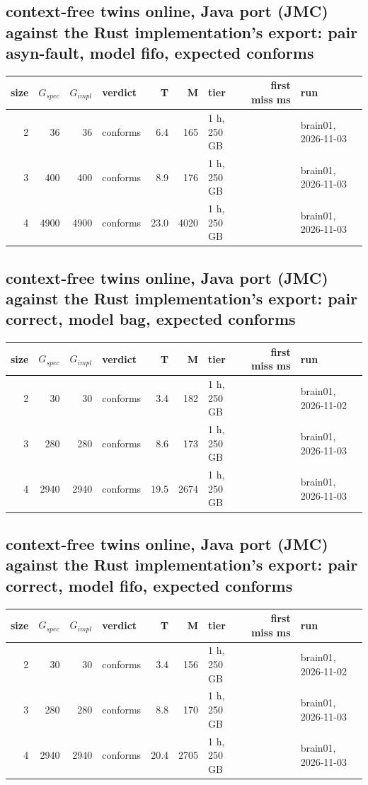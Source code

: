 \documentclass[10pt]{article}
\begin{document}
\subsection*{context-free twins online, Java port (JMC) against the Rust implementation's export: pair \textsf{asyn-fault}, model fifo, expected conforms}
\begin{longtable}{@{}rrrlrrlrl@{}}
\toprule
size & $G_{\mathit{spec}}$ & $G_{\mathit{impl}}$ & verdict & T & M & tier & first miss ms & run \\
\midrule
\endhead
\color{blue} 2 & 36 & 36 & conforms & 6.4 & 165 & 1 h, 250 GB &  & brain01, 2026-11-03 \\
\color{blue} 3 & 400 & 400 & conforms & 8.9 & 176 & 1 h, 250 GB &  & brain01, 2026-11-03 \\
\color{blue} 4 & 4900 & 4900 & conforms & 23.0 & 4020 & 1 h, 250 GB &  & brain01, 2026-11-03 \\
\bottomrule
\end{longtable}
\subsection*{context-free twins online, Java port (JMC) against the Rust implementation's export: pair \textsf{correct}, model bag, expected conforms}
\begin{longtable}{@{}rrrlrrlrl@{}}
\toprule
size & $G_{\mathit{spec}}$ & $G_{\mathit{impl}}$ & verdict & T & M & tier & first miss ms & run \\
\midrule
\endhead
\color{red} 2 & 30 & 30 & conforms & 3.4 & 182 & 1 h, 250 GB &  & brain01, 2026-11-02 \\
\color{blue} 3 & 280 & 280 & conforms & 8.6 & 173 & 1 h, 250 GB &  & brain01, 2026-11-03 \\
\color{blue} 4 & 2940 & 2940 & conforms & 19.5 & 2674 & 1 h, 250 GB &  & brain01, 2026-11-03 \\
\bottomrule
\end{longtable}
\subsection*{context-free twins online, Java port (JMC) against the Rust implementation's export: pair \textsf{correct}, model fifo, expected conforms}
\begin{longtable}{@{}rrrlrrlrl@{}}
\toprule
size & $G_{\mathit{spec}}$ & $G_{\mathit{impl}}$ & verdict & T & M & tier & first miss ms & run \\
\midrule
\endhead
\color{red} 2 & 30 & 30 & conforms & 3.4 & 156 & 1 h, 250 GB &  & brain01, 2026-11-02 \\
\color{blue} 3 & 280 & 280 & conforms & 8.8 & 170 & 1 h, 250 GB &  & brain01, 2026-11-03 \\
\color{blue} 4 & 2940 & 2940 & conforms & 20.4 & 2705 & 1 h, 250 GB &  & brain01, 2026-11-03 \\
\bottomrule
\end{longtable}
\end{document}

